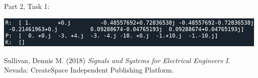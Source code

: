 \documentclass[12pt]{report}
\begin{document}
Part 2, Task 1:
\begin{center}
	\includegraphics[scale = 0.92]{Lab 6 - Print Outputs/Part2-Task1.png}\\[1.0 cm]
\end{center}

\newpage
\begin{thebibliography}{111}
		
	Sullivan, Dennis M. (2018) {\it  Signals and Systems for Electrical Engineers I}. Nevada: CreateSpace Independent Publishing Platform.
		
\end{thebibliography}
\end{document}
